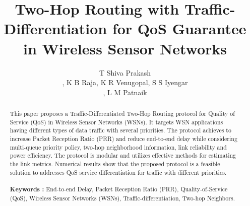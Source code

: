 \documentclass[fleqn,twoside]{article}
\title{\textbf{Two-Hop Routing with Traffic-Differentiation for QoS Guarantee in Wireless Sensor Networks}}
\author{T Shiva Prakash\address[DCSE]{Department of Computer Science and Engineering, University Visvesvaraya College of\\~ Engineering, Bangalore University, Bangalore 560 001 India, Contact: spt@ieee.org\\},
K B Raja\addressmark,
K R Venugopal\addressmark,
S S Iyengar\address[DCSE]{Florida International University, Miami, Florida, USA\\},
L M Patnaik\address{Honorary Professor, Indian Institute of Science, Bangalore 560 012, India}}
\begin{document}
\begin{abstract}

This paper proposes a Traffic-Differentiated Two-Hop Routing protocol for Quality of Service (QoS) 
in Wireless Sensor Networks (WSNs).
It targets WSN applications having different types of data traffic with several priorities.
The protocol achieves to increase Packet Reception Ratio (PRR) and reduce end-to-end delay while considering 
multi-queue priority policy, two-hop neighborhood information, link reliability and power efficiency. The protocol is modular and 
utilizes effective methods for estimating the link metrics. Numerical results show 
that the proposed protocol is a feasible solution to addresses QoS service differentiation for traffic with different priorities. \\\\
{\bf Keywords :} End-to-end Delay, Packet Reception Ratio (PRR), Quality-of-Service (QoS), Wireless Sensor Networks (WSNs), Traffic-differentiation, Two-hop Neighbors.
\end{abstract}

\maketitle
\end{document}
